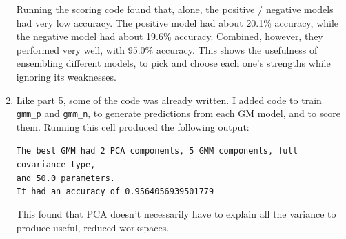 \documentclass{article}
\begin{document}
\begin{enumerate}[start=1]
    Running the scoring code found that, alone, the positive / negative models had very low accuracy. The positive model had about 20.1\% accuracy, while the negative model had about 19.6\% accuracy. Combined, however, they performed very well, with 95.0\% accuracy. This shows the usefulness of ensembling different models, to pick and choose each one's strengths while ignoring its weaknesses.
    
\item %
    Like part 5, some of the code was already written. I added code to train \texttt{gmm\_p} and \texttt{gmm\_n}, to generate predictions from each GM model, and to score them. Running this cell produced the following output:
    
    \texttt{The best GMM had 2 PCA components, 5 GMM components, full covariance type, \\and 50.0 parameters. \\
    It had an accuracy of 0.9564056939501779}
    
    This found that PCA doesn't necessarily have to explain all the variance to produce useful, reduced workspaces.
    
\end{enumerate}
\end{document}
